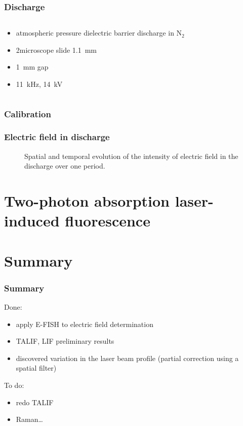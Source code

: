 \documentclass{beamer}
\begin{document}
\begin{frame}
	\frametitle{Discharge}
	\begin{columns}[c]
	\begin{column}{0.5\textwidth}
		\begin{itemize}
			\item atmospheric pressure dielectric barrier discharge
				in $\mathrm{N}_2$
			\item 2\times microscope slide \SI{1.1}{\milli\metre}
			\item \SI{1}{\milli\metre} gap
			\item \SI{11}{\kilo\hertz}, \SI{14}{\kilo\volt}
		\end{itemize}
	\end{column}
	\end{columns}
\end{frame}

\begin{frame}
	\frametitle{Calibration}
	\graphicspath{{../efish/}}
	
\end{frame}

\begin{frame}
	\frametitle{Electric field in discharge}
	\begin{figure}
		\centering
		\small
		\graphicspath{{../efish/}}
		
		\caption{Spatial and temporal evolution of the intensity
			of electric field in the discharge over one period.}
	\end{figure}
\end{frame}

\section[TALIF]{Two-photon absorption laser-induced fluorescence}

\section{Summary}
\begin{frame}
	\frametitle{Summary}
	Done:
	\begin{itemize}
		\item apply E-FISH to electric field determination
		\item TALIF, LIF preliminary results
		\item discovered variation in the laser beam profile
			(partial correction using a spatial filter)
	\end{itemize}
	\bigskip
	To do:
	\begin{itemize}
		\item redo TALIF
		\item Raman\dots
	\end{itemize}
\end{frame}
\end{document}
